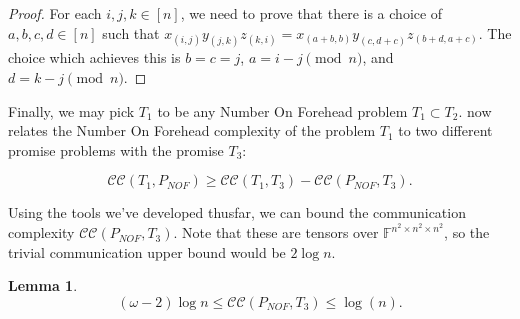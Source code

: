 \documentclass[10pt,a4paper]{article}
\newtheorem{lemma}[theorem]{Lemma}
\newcommand{\F}{\mathbb{F}}
\newcommand{\bZ}{\mathbb{Z}}
\newcommand{\eval}{\textsc{Eval}}
\newcommand{\cc}{\mathcal{CC}}
\newcommand{\mmP}{P_{\textsc{nof}}}
\newcommand{\inprod}[1]{\langle #1 \rangle}
\newcommand{\jnote}[1]{\todo[inline, color=blue!30!white]{#1 \\ -\textsc{Jarek}}}
\newcommand{\joshnote}[1]{\todo[inline, color=red!30!white]{#1 \\ -\textsc{Josh}}}
\begin{document}
\begin{proof}
For each $i,j,k \in [n]$, we need to prove that there is a choice of $a,b,c,d \in [n]$ such that $x_{(i,j)} y_{(j,k)} z_{(k,i)} = x_{(a+b,b)} y_{(c,d+c)} z_{(b+d, a+c)}$. The choice which achieves this is $b=c=j$, $a = i-j \pmod{n}$, and $d=k-j \pmod{n}$.
\end{proof}

Finally, we may pick $T_1$ to be any Number On Forehead problem $T_1 \subset T_2$.  now relates the Number On Forehead complexity of the problem $T_1$ to two different promise problems with the promise $T_3$:

$$\cc(T_1, P_{NOF}) \geq \cc(T_1, T_3) - \cc(P_{NOF}, T_3).$$

Using the tools we've developed thusfar, we can bound the communication complexity $\cc(P_{NOF}, T_3)$. Note that these are tensors over $\F^{n^2 \times n^2 \times n^2}$, so the trivial communication upper bound would be $2 \log n$.

\begin{lemma} \label{lem:NOFingroup}
    $$(\omega - 2) \log n \leq \cc(P_{NOF}, T_3) \leq \log(n).$$
\end{lemma}
\end{document}
